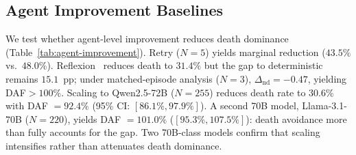 \begin{table}[t]
\centering
\scriptsize
\setlength{\tabcolsep}{2pt}
\caption{Cross-model and cross-environment summary. SW = ScienceWorld, ALF = ALFWorld. Death dominance replicates across three 7--9B families and intensifies under $10{\times}$ scaling; ALFWorld shows information-asymmetry signal; MATH shows none. DR = death rate (\%).}
\label{tab:cross-model-env}
\end{table}

\subsection{Agent Improvement Baselines}
\label{sec:agent-improvement}

We test whether agent-level improvement reduces death dominance (Table~\ref{tab:agent-improvement}). Retry ($N{=}5$) yields marginal reduction ($43.5\%$ vs.\ $48.0\%$). Reflexion~\citep{reflexion-2023} reduces death to $31.4\%$ but the gap to deterministic remains $15.1$~pp; under matched-episode analysis ($N{=}3$), $\Delta_{\text{nd}} = -0.47$, yielding DAF${}>100\%$. Scaling to Qwen2.5-72B ($N{=}255$) reduces death rate to $30.6\%$ with DAF $= 92.4\%$ (95\% CI: $[86.1\%, 97.9\%]$). A second 70B model, Llama-3.1-70B ($N{=}220$), yields DAF $= 101.0\%$ ($[95.3\%, 107.5\%]$): death avoidance more than fully accounts for the gap. Two 70B-class models confirm that scaling intensifies rather than attenuates death dominance.

